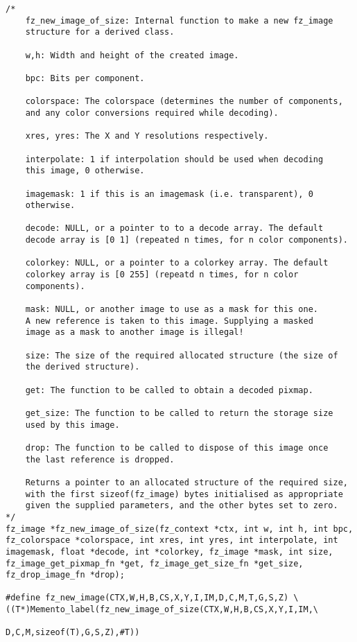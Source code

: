 \documentclass[oneside]{book}
\begin{document}
\begin{lstlisting}
/*
	fz_new_image_of_size: Internal function to make a new fz_image
	structure for a derived class.

	w,h: Width and height of the created image.

	bpc: Bits per component.

	colorspace: The colorspace (determines the number of components,
	and any color conversions required while decoding).

	xres, yres: The X and Y resolutions respectively.

	interpolate: 1 if interpolation should be used when decoding
	this image, 0 otherwise.

	imagemask: 1 if this is an imagemask (i.e. transparent), 0
	otherwise.

	decode: NULL, or a pointer to to a decode array. The default
	decode array is [0 1] (repeated n times, for n color components).

	colorkey: NULL, or a pointer to a colorkey array. The default
	colorkey array is [0 255] (repeatd n times, for n color
	components).

	mask: NULL, or another image to use as a mask for this one.
	A new reference is taken to this image. Supplying a masked
	image as a mask to another image is illegal!

	size: The size of the required allocated structure (the size of
	the derived structure).

	get: The function to be called to obtain a decoded pixmap.

	get_size: The function to be called to return the storage size
	used by this image.

	drop: The function to be called to dispose of this image once
	the last reference is dropped.

	Returns a pointer to an allocated structure of the required size,
	with the first sizeof(fz_image) bytes initialised as appropriate
	given the supplied parameters, and the other bytes set to zero.
*/
fz_image *fz_new_image_of_size(fz_context *ctx, int w, int h, int bpc, fz_colorspace *colorspace, int xres, int yres, int interpolate, int imagemask, float *decode, int *colorkey, fz_image *mask, int size, fz_image_get_pixmap_fn *get, fz_image_get_size_fn *get_size, fz_drop_image_fn *drop);

#define fz_new_image(CTX,W,H,B,CS,X,Y,I,IM,D,C,M,T,G,S,Z) \
((T*)Memento_label(fz_new_image_of_size(CTX,W,H,B,CS,X,Y,I,IM,\
											D,C,M,sizeof(T),G,S,Z),#T))
\end{lstlisting}
\end{document}
